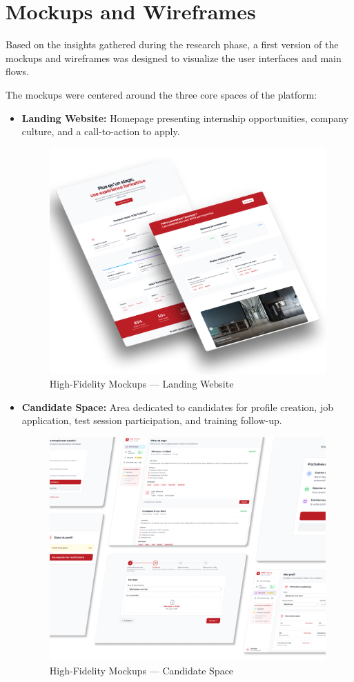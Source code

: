 \section{Mockups and Wireframes}
\noindent
Based on the insights gathered during the research phase, a first version of the mockups and wireframes was designed to visualize the user interfaces and main flows.

\medskip

\noindent
The mockups were centered around the three core spaces of the platform:

\begin{itemize}
    \item \textbf{Landing Website:} Homepage presenting internship opportunities, company culture, and a call-to-action to apply.
    \begin{figure}[H]
        \centering
        \includegraphics[width=0.\textwidth]{images/landing_mockup.png}
        \caption{High-Fidelity Mockups — Landing Website}
    \end{figure}
    \item \textbf{Candidate Space:} Area dedicated to candidates for profile creation, job application, test session participation, and training follow-up.
    \begin{figure}[H]
        \centering
        \includegraphics[width=\textwidth]{images/mockups-candidat.png}
        \caption{High-Fidelity Mockups — Candidate Space}

\end{figure}
\end{itemize}
